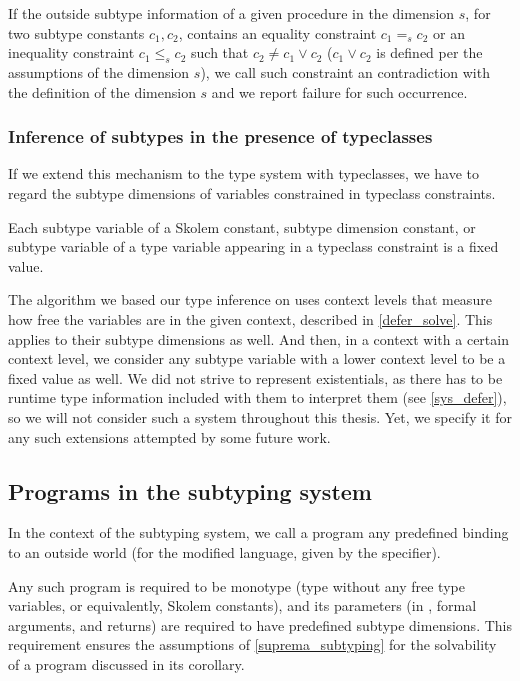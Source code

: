 \begin{remark}
    \label{def:contra}

    If the outside subtype information of a given procedure in the dimension $s$, for two subtype constants $c_1, c_2$, contains an equality constraint $c_1 =_s c_2$ or an inequality constraint $c_1 \leq_s c_2$ such that $c_2 \neq c_1 \lor c_2$ ($c_1 \lor c_2$ is defined per the assumptions of the dimension $s$), we call such constraint an contradiction with the definition of the dimension $s$ and we report failure for such occurrence.
\end{remark}

\subsubsection{Inference of subtypes in the presence of typeclasses}

If we extend this mechanism to the type system with typeclasses, we have to regard the subtype dimensions of variables constrained in typeclass constraints.

Each subtype variable of a Skolem constant, subtype dimension constant, or subtype variable of a type variable appearing in a typeclass constraint is a fixed value.

The algorithm we based our type inference on uses context levels that measure how free the variables are in the given context, described in \cref{defer_solve}. This applies to their subtype dimensions as well. And then, in a context with a certain context level, we consider any subtype variable with a lower context level to be a fixed value as well. We did not strive to represent existentials, as there has to be runtime type information included with them to interpret them (see \cref{sys_defer}), so we will not consider such a system throughout this thesis. Yet, we specify it for any such extensions attempted by some future work.

\subsection{Programs in the subtyping system}

In the context of the subtyping system, we call a program any predefined binding to an outside world (for the modified \cmm language, given by the  specifier).

Any such program is required to be monotype (type without any free type variables, or equivalently, Skolem constants), and its parameters (in \cmm, formal arguments, and returns) are required to have predefined subtype dimensions. This requirement ensures the assumptions of \cref{suprema_subtyping} for the solvability of a program discussed in its corollary.

